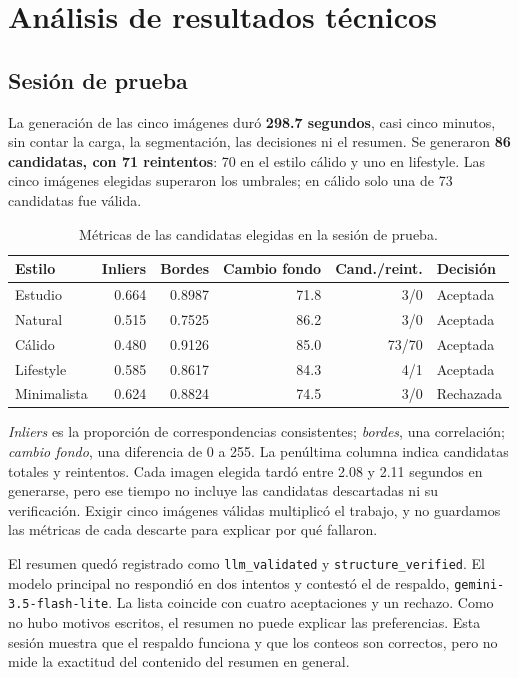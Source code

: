 \documentclass[11pt,a4paper]{article}
\begin{document}
\clearpage
\section{Análisis de resultados técnicos}
\subsection{Sesión de prueba}
La generación de las cinco imágenes duró \textbf{298.7 segundos}, casi cinco minutos, sin contar la carga, la segmentación, las decisiones ni el resumen. Se generaron \textbf{86 candidatas, con 71 reintentos}: 70 en el estilo cálido y uno en lifestyle. Las cinco imágenes elegidas superaron los umbrales; en cálido solo una de 73 candidatas fue válida.

\begin{table}[h]\centering\small
\caption{Métricas de las candidatas elegidas en la sesión de prueba.}
\begin{tabular}{@{}lrrrrl@{}}\toprule
Estilo & Inliers & Bordes & Cambio fondo & Cand./reint. & Decisión \\\midrule
Estudio & 0.664 & 0.8987 & 71.8 & 3/0 & Aceptada \\
Natural & 0.515 & 0.7525 & 86.2 & 3/0 & Aceptada \\
Cálido & 0.480 & 0.9126 & 85.0 & 73/70 & Aceptada \\
Lifestyle & 0.585 & 0.8617 & 84.3 & 4/1 & Aceptada \\
Minimalista & 0.624 & 0.8824 & 74.5 & 3/0 & Rechazada \\\bottomrule
\end{tabular}
\end{table}
\textit{Inliers} es la proporción de correspondencias consistentes; \textit{bordes}, una correlación; \textit{cambio fondo}, una diferencia de 0 a 255. La penúltima columna indica candidatas totales y reintentos. Cada imagen elegida tardó entre 2.08 y 2.11 segundos en generarse, pero ese tiempo no incluye las candidatas descartadas ni su verificación. Exigir cinco imágenes válidas multiplicó el trabajo, y no guardamos las métricas de cada descarte para explicar por qué fallaron.

El resumen quedó registrado como \texttt{llm\_validated} y \texttt{structure\_verified}. El modelo principal no respondió en dos intentos y contestó el de respaldo, \texttt{gemini-3.5-flash-lite}. La lista coincide con cuatro aceptaciones y un rechazo. Como no hubo motivos escritos, el resumen no puede explicar las preferencias. Esta sesión muestra que el respaldo funciona y que los conteos son correctos, pero no mide la exactitud del contenido del resumen en general.
\end{document}
